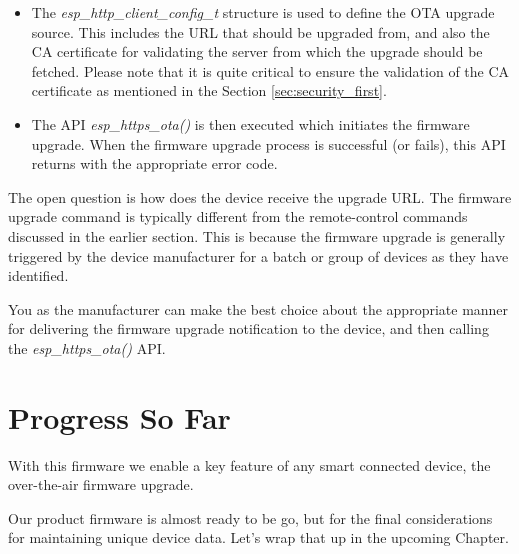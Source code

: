 \documentclass[main.tex]{subfiles}
\begin{document}
\begin{itemize}
    \item The \textit{esp\_http\_client\_config\_t} structure is used to define the OTA upgrade source. This includes the URL that should be upgraded from, and also the CA certificate for validating the server from which the upgrade should be fetched. Please note that it is quite critical to ensure the validation of the CA certificate as mentioned in the Section \ref{sec:security_first}.
    \item The API \textit{esp\_https\_ota()} is then executed which initiates the firmware upgrade. When the firmware upgrade process is successful (or fails), this API returns with the appropriate error code.
\end{itemize}

The open question is how does the device receive the upgrade URL. The firmware upgrade command is typically different from the remote-control commands discussed in the earlier section. This is because the firmware upgrade is generally triggered by the device manufacturer for a batch or group of devices as they have identified.

You as the manufacturer can make the best choice about the appropriate manner for delivering the firmware upgrade notification to the device, and then calling the \textit{esp\_https\_ota()} API.

\section{Progress So Far}
With this firmware we enable a key feature of any smart connected device, the over-the-air firmware upgrade. 

Our product firmware is almost ready to be go, but for the final considerations for maintaining unique device data. Let's wrap that up in the upcoming Chapter.
\end{document}
